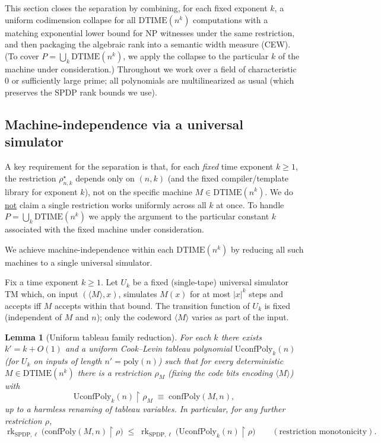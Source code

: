 \documentclass[12pt]{article}
\DeclareMathOperator{\rk}{rk}
\newcommand{\poly}{\mathrm{poly}}
\newtheorem{lemma}[theorem]{Lemma}
\theoremstyle{definition}
\theoremstyle{definition}
\theoremstyle{remark}
\theoremstyle{remark}
\begin{document}
This section closes the separation by combining, for each fixed exponent $k$, a uniform codimension collapse for all $\mathrm{DTIME}(n^k)$ computations with a matching exponential lower bound for NP witnesses under the same restriction, and then packaging the algebraic rank into a semantic width measure (CEW). (To cover $P=\bigcup_k\mathrm{DTIME}(n^k)$, we apply the collapse to the particular $k$ of the machine under consideration.) Throughout we work over a field of characteristic~$0$ or sufficiently large prime; all polynomials are multilinearized as usual (which preserves the SPDP rank bounds we use).

\subsection{Machine-independence via a universal simulator}
\label{subsec:universal-simulator}

A key requirement for the separation is that, for each \emph{fixed} time exponent $k\ge 1$,
the restriction $\rho^\star_{n,k}$ depends only on $(n,k)$ (and the fixed compiler/template
library for exponent $k$), not on the specific machine $M\in \mathrm{DTIME}(n^k)$.
We do \underline{not} claim a single restriction works uniformly across all $k$ at once.
To handle $P=\bigcup_k \mathrm{DTIME}(n^k)$ we apply the argument to the particular constant $k$
associated with the fixed machine under consideration.

We achieve machine-independence within each $\mathrm{DTIME}(n^k)$ by reducing all such
machines to a single universal simulator.

Fix a time exponent $k\ge 1$. Let $U_k$ be a fixed (single-tape) universal simulator TM
which, on input $(\langle M\rangle,x)$, simulates $M(x)$ for at most $|x|^k$ steps and
accepts iff $M$ accepts within that bound. The transition function of $U_k$ is fixed (independent
of $M$ and $n$); only the codeword $\langle M\rangle$ varies as part of the input.

\begin{lemma}[Uniform tableau family reduction]
\label{lem:universal-tableau-reduction}
For each $k$ there exists $k'=k+O(1)$ and a uniform Cook--Levin tableau polynomial
$\mathrm{UconfPoly}_k(n)$ (for $U_k$ on inputs of length $n'=\poly(n)$) such that for every
deterministic $M\in \mathrm{DTIME}(n^k)$ there is a restriction $\rho_M$ (fixing the code bits
encoding $\langle M\rangle$) with
\[
\mathrm{UconfPoly}_k(n) \!\upharpoonright\! \rho_M \;\equiv\; \mathrm{confPoly}(M,n),
\]
up to a harmless renaming of tableau variables. In particular, for any further restriction $\rho$,
\[
\rk_{\mathrm{SPDP},\ell}\bigl(\mathrm{confPoly}(M,n)\!\upharpoonright\!\rho\bigr)
\;\le\;
\rk_{\mathrm{SPDP},\ell}\bigl(\mathrm{UconfPoly}_k(n)\!\upharpoonright\!\rho\bigr)
\qquad(\text{restriction monotonicity}).
\]
\end{lemma}
\end{document}
